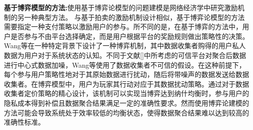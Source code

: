 
\textbf{基于博弈模型的方法:}使用基于博弈论模型的问题建模\cite{DejunJ, he2017exchange,Yang17}是网络经济学中研究激励机制的另一种典型方法。
与基于拍卖的激励机制设计相似，基于博弈论模型的方法需要指定一种支付策略以激励用户的参与。所不同的是，在基于博弈的方法中，用户是否参与不由平台选择确定，而是用户根据平台的奖励规则做出策略性的决策。
Wang等\cite{wang2016value}在一种特定背景下设计了一种博弈机制，其中数据收集者购得的用户私人数据为用户对于系统状态的认知。不同于文献[]中所考虑的可信平台对聚合后数据进行中心式数据加噪，Wang等\cite{wang2016value}使用了数据收集者不可信的假设。在这种前提下，每个参与用户策略性地对于其原始数据进行扰动，随后将带噪声的数据发送给数据收集者。在博弈模型中，用户为玩家其行动对应于其数据扰动策略。通过对于数据收集者定价策略的精心设计，该机制可以实现当博弈达到纳什均衡时，参与用户的隐私成本得到补偿且数据聚合结果满足一定的准确性要求。然而使用博弈论建模的方法可能会导致系统处于效率较低的均衡状态，使得数据聚合结果难以达到较高的准确性标准。

